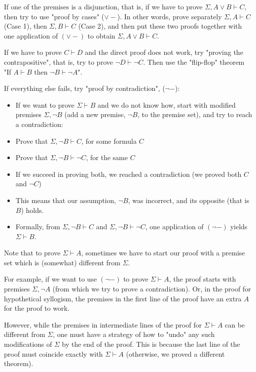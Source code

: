 \documentclass{article}
\begin{document}
If one of the premises is a disjunction, that is, if we have to prove $\Sigma, A \vee B \vdash C$, then try to use "proof by cases" ($\vee -$). In other words, prove separately $\Sigma, A \vdash C$ (Case 1), then $\Sigma, B \vdash C$ (Case 2), and then put these two proofs together with one application of $(\vee -)$ to obtain $\Sigma, A \vee B \vdash C$.

If we have to prove $C \vdash D$ and the direct proof does not work, try "proving the contrapositive", that is, try to prove $\neg D \vdash \neg C$. Then use the "flip-flop" theorem "If $A \vdash B$ then $\neg B \vdash \neg A$".

If everything else fails, try "proof by contradiction", ($\neg -$):

\begin{itemize}
    \item If we want to prove $\Sigma \vdash B$ and we do not know how, start with modified premises $\Sigma, \neg B$ (add a new premise, $\neg B$, to the premise set), and try to reach a contradiction:
    \item Prove that $\Sigma, \neg B \vdash C$, for some formula $C$ 
    \item Prove that $\Sigma, \neg B \vdash \neg C$, for the same $C$
    \item If we succeed in proving both, we reached a contradiction (we proved both $C$ and $\neg C$)
    \item This means that our assumption, $\neg B$, was incorrect, and its opposite (that is $B$) holds.
    \item Formally, from $\Sigma, \neg B \vdash C$ and $\Sigma, \neg B \vdash \neg C$, one application of $(\neg -)$ yields $\Sigma \vdash B$.
\end{itemize}

Note that to prove $\Sigma \vdash A$, sometimes we have to start our proof with a premise set which is (somewhat) different from $\Sigma$. 

For example, if we want to use $(\neg -)$ to prove $\Sigma \vdash A$, the proof starts with premises $\Sigma, \neg A$ (from which we try to prove a contradiction). Or, in the proof for hypothetical syllogism, the premises in the first line of the proof have an extra $A$ for the proof to work. 

However, while the premises in intermediate lines of the proof for $\Sigma \vdash A$ can be different from $\Sigma$, one must have a strategy of how to "undo" any such modifications of $\Sigma$ by the end of the proof. This is because the last line of the proof must coincide exactly with $\Sigma \vdash A$ (otherwise, we proved a different theorem).
\end{document}
